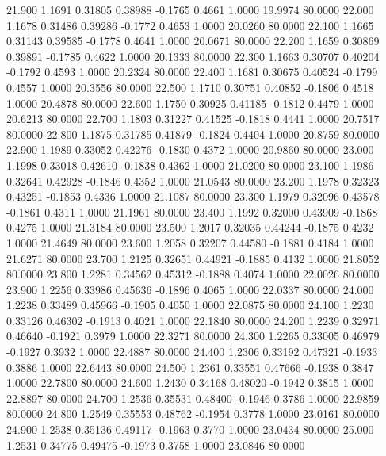   21.900   1.1691   0.31805   0.38988  -0.1765   0.4661   1.0000  19.9974  80.0000
  22.000   1.1678   0.31486   0.39286  -0.1772   0.4653   1.0000  20.0260  80.0000
  22.100   1.1665   0.31143   0.39585  -0.1778   0.4641   1.0000  20.0671  80.0000
  22.200   1.1659   0.30869   0.39891  -0.1785   0.4622   1.0000  20.1333  80.0000
  22.300   1.1663   0.30707   0.40204  -0.1792   0.4593   1.0000  20.2324  80.0000
  22.400   1.1681   0.30675   0.40524  -0.1799   0.4557   1.0000  20.3556  80.0000
  22.500   1.1710   0.30751   0.40852  -0.1806   0.4518   1.0000  20.4878  80.0000
  22.600   1.1750   0.30925   0.41185  -0.1812   0.4479   1.0000  20.6213  80.0000
  22.700   1.1803   0.31227   0.41525  -0.1818   0.4441   1.0000  20.7517  80.0000
  22.800   1.1875   0.31785   0.41879  -0.1824   0.4404   1.0000  20.8759  80.0000
  22.900   1.1989   0.33052   0.42276  -0.1830   0.4372   1.0000  20.9860  80.0000
  23.000   1.1998   0.33018   0.42610  -0.1838   0.4362   1.0000  21.0200  80.0000
  23.100   1.1986   0.32641   0.42928  -0.1846   0.4352   1.0000  21.0543  80.0000
  23.200   1.1978   0.32323   0.43251  -0.1853   0.4336   1.0000  21.1087  80.0000
  23.300   1.1979   0.32096   0.43578  -0.1861   0.4311   1.0000  21.1961  80.0000
  23.400   1.1992   0.32000   0.43909  -0.1868   0.4275   1.0000  21.3184  80.0000
  23.500   1.2017   0.32035   0.44244  -0.1875   0.4232   1.0000  21.4649  80.0000
  23.600   1.2058   0.32207   0.44580  -0.1881   0.4184   1.0000  21.6271  80.0000
  23.700   1.2125   0.32651   0.44921  -0.1885   0.4132   1.0000  21.8052  80.0000
  23.800   1.2281   0.34562   0.45312  -0.1888   0.4074   1.0000  22.0026  80.0000
  23.900   1.2256   0.33986   0.45636  -0.1896   0.4065   1.0000  22.0337  80.0000
  24.000   1.2238   0.33489   0.45966  -0.1905   0.4050   1.0000  22.0875  80.0000
  24.100   1.2230   0.33126   0.46302  -0.1913   0.4021   1.0000  22.1840  80.0000
  24.200   1.2239   0.32971   0.46640  -0.1921   0.3979   1.0000  22.3271  80.0000
  24.300   1.2265   0.33005   0.46979  -0.1927   0.3932   1.0000  22.4887  80.0000
  24.400   1.2306   0.33192   0.47321  -0.1933   0.3886   1.0000  22.6443  80.0000
  24.500   1.2361   0.33551   0.47666  -0.1938   0.3847   1.0000  22.7800  80.0000
  24.600   1.2430   0.34168   0.48020  -0.1942   0.3815   1.0000  22.8897  80.0000
  24.700   1.2536   0.35531   0.48400  -0.1946   0.3786   1.0000  22.9859  80.0000
  24.800   1.2549   0.35553   0.48762  -0.1954   0.3778   1.0000  23.0161  80.0000
  24.900   1.2538   0.35136   0.49117  -0.1963   0.3770   1.0000  23.0434  80.0000
  25.000   1.2531   0.34775   0.49475  -0.1973   0.3758   1.0000  23.0846  80.0000
